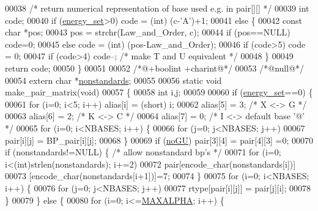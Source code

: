 \begin{DoxyCode}
00038   \textcolor{comment}{/* return numerical representation of base used e.g. in pair[][] */}
00039   \textcolor{keywordtype}{int} code;
00040   \textcolor{keywordflow}{if} (\hyperlink{group__model__details_gafb1ef1166da85092ae8a325e02dcae71}{energy\_set}>0) code = (int) (c-\textcolor{charliteral}{'A'})+1;
00041   \textcolor{keywordflow}{else} \{
00042     \textcolor{keyword}{const} \textcolor{keywordtype}{char} *pos;
00043     pos = strchr(Law\_and\_Order, c);
00044     \textcolor{keywordflow}{if} (pos==NULL) code=0;
00045     \textcolor{keywordflow}{else} code = (int) (pos-Law\_and\_Order);
00046     \textcolor{keywordflow}{if} (code>5) code = 0;
00047     \textcolor{keywordflow}{if} (code>4) code--; \textcolor{comment}{/* make T and U equivalent */}
00048   \}
00049   \textcolor{keywordflow}{return} code;
00050 \}
00051 
00052 \textcolor{comment}{/*@+boolint +charint@*/}
00053 \textcolor{comment}{/*@null@*/}
00054 \textcolor{keyword}{extern} \textcolor{keywordtype}{char} *\hyperlink{group__model__details_ga2695d91cc535d09c2eae5c3884e2ec64}{nonstandards};
00055 
00056 \textcolor{keyword}{static} \textcolor{keywordtype}{void} make\_pair\_matrix(\textcolor{keywordtype}{void})
00057 \{
00058    \textcolor{keywordtype}{int} i,j;
00059 
00060    \textcolor{keywordflow}{if} (\hyperlink{group__model__details_gafb1ef1166da85092ae8a325e02dcae71}{energy\_set}==0) \{
00061       \textcolor{keywordflow}{for} (i=0; i<5; i++) alias[i] = (\textcolor{keywordtype}{short}) i;
00062       alias[5] = 3; \textcolor{comment}{/* X <-> G */}
00063       alias[6] = 2; \textcolor{comment}{/* K <-> C */}
00064       alias[7] = 0; \textcolor{comment}{/* I <-> default base '@' */}
00065       \textcolor{keywordflow}{for} (i=0; i<NBASES; i++) \{
00066           \textcolor{keywordflow}{for} (j=0; j<NBASES; j++)
00067             pair[i][j] = BP\_pair[i][j];
00068       \}
00069       \textcolor{keywordflow}{if} (\hyperlink{group__model__details_gabf380d09e4f1ab94fc6af57cf0ad5d32}{noGU}) pair[3][4] = pair[4][3] =0;
00070       \textcolor{keywordflow}{if} (nonstandards!=NULL) \{  \textcolor{comment}{/* allow nonstandard bp's */}
00071          \textcolor{keywordflow}{for} (i=0; i<(int)strlen(nonstandards); i+=2)
00072             pair[encode\_char(nonstandards[i])]
00073               [encode\_char(nonstandards[i+1])]=7;
00074       \}
00075       \textcolor{keywordflow}{for} (i=0; i<NBASES; i++) \{
00076           \textcolor{keywordflow}{for} (j=0; j<NBASES; j++)
00077            rtype[pair[i][j]] = pair[j][i];
00078       \}
00079    \} \textcolor{keywordflow}{else} \{
00080       \textcolor{keywordflow}{for} (i=0; i<=\hyperlink{group__model__details_ga05a5ffe718aa431d97419a12fb082379}{MAXALPHA}; i++) \{

\end{DoxyCode}
